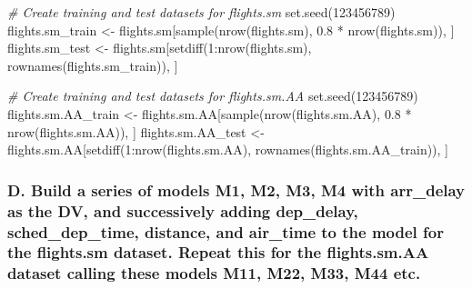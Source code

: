 \documentclass[
]{article}
\newenvironment{Shaded}{\begin{snugshade}}{\end{snugshade}}
\newcommand{\CommentTok}[1]{\textcolor[rgb]{0.56,0.35,0.01}{\textit{#1}}}
\newcommand{\DecValTok}[1]{\textcolor[rgb]{0.00,0.00,0.81}{#1}}
\newcommand{\FloatTok}[1]{\textcolor[rgb]{0.00,0.00,0.81}{#1}}
\newcommand{\FunctionTok}[1]{\textcolor[rgb]{0.00,0.00,0.00}{#1}}
\newcommand{\NormalTok}[1]{#1}
\newcommand{\OtherTok}[1]{\textcolor[rgb]{0.56,0.35,0.01}{#1}}
\newcommand{\SpecialCharTok}[1]{\textcolor[rgb]{0.00,0.00,0.00}{#1}}
\begin{document}
\begin{Shaded}
\begin{Highlighting}[]
\CommentTok{\# Create training and test datasets for flights.sm}
\FunctionTok{set.seed}\NormalTok{(}\DecValTok{123456789}\NormalTok{)}
\NormalTok{flights.sm\_train }\OtherTok{\textless{}{-}}\NormalTok{ flights.sm[}\FunctionTok{sample}\NormalTok{(}\FunctionTok{nrow}\NormalTok{(flights.sm), }\FloatTok{0.8} \SpecialCharTok{*}
    \FunctionTok{nrow}\NormalTok{(flights.sm)), ]}
\NormalTok{flights.sm\_test }\OtherTok{\textless{}{-}}\NormalTok{ flights.sm[}\FunctionTok{setdiff}\NormalTok{(}\DecValTok{1}\SpecialCharTok{:}\FunctionTok{nrow}\NormalTok{(flights.sm), }\FunctionTok{rownames}\NormalTok{(flights.sm\_train)),}
\NormalTok{    ]}
\end{Highlighting}
\end{Shaded}

\begin{Shaded}
\begin{Highlighting}[]
\CommentTok{\# Create training and test datasets for flights.sm.AA}
\FunctionTok{set.seed}\NormalTok{(}\DecValTok{123456789}\NormalTok{)}
\NormalTok{flights.sm.AA\_train }\OtherTok{\textless{}{-}}\NormalTok{ flights.sm.AA[}\FunctionTok{sample}\NormalTok{(}\FunctionTok{nrow}\NormalTok{(flights.sm.AA),}
    \FloatTok{0.8} \SpecialCharTok{*} \FunctionTok{nrow}\NormalTok{(flights.sm.AA)), ]}
\NormalTok{flights.sm.AA\_test }\OtherTok{\textless{}{-}}\NormalTok{ flights.sm.AA[}\FunctionTok{setdiff}\NormalTok{(}\DecValTok{1}\SpecialCharTok{:}\FunctionTok{nrow}\NormalTok{(flights.sm.AA),}
    \FunctionTok{rownames}\NormalTok{(flights.sm.AA\_train)), ]}
\end{Highlighting}
\end{Shaded}

\hypertarget{d.-build-a-series-of-models-m1-m2-m3-m4-with-arr_delay-as-the-dv-and-successively-adding-dep_delay-sched_dep_time-distance-and-air_time-to-the-model-for-the-flights.sm-dataset.-repeat-this-for-the-flights.sm.aa-dataset-calling-these-models-m11-m22-m33-m44-etc.}{%
\subsubsection{D. Build a series of models M1, M2, M3, M4 with
arr\_delay as the DV, and successively adding dep\_delay,
sched\_dep\_time, distance, and air\_time to the model for the
flights.sm dataset. Repeat this for the flights.sm.AA dataset calling
these models M11, M22, M33, M44
etc.}\label{d.-build-a-series-of-models-m1-m2-m3-m4-with-arr_delay-as-the-dv-and-successively-adding-dep_delay-sched_dep_time-distance-and-air_time-to-the-model-for-the-flights.sm-dataset.-repeat-this-for-the-flights.sm.aa-dataset-calling-these-models-m11-m22-m33-m44-etc.}}
\end{document}
